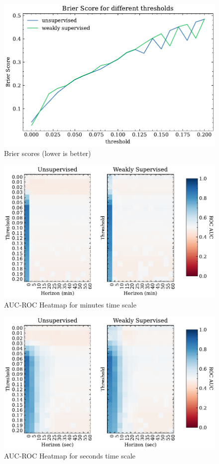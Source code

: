 \begin{figure}[h]
\centering
  \includegraphics{5Results/figs/bsle/brier_score_for_thresholds.pdf}
  \caption{Brier scores (lower is better)}
\end{figure}
\begin{figure}[h]
\centering
  \includegraphics{5Results/figs/bsle/auc_roc_scores_for_thresholds_and_horizons_min.pdf}
  \caption{AUC-ROC Heatmap for minutes time scale}
\end{figure}
\begin{figure}[h]
\centering
  \includegraphics{5Results/figs/bsle/auc_roc_scores_for_thresholds_and_horizons_sec.pdf}
  \caption{AUC-ROC Heatmap for seconds time scale}
\end{figure}

